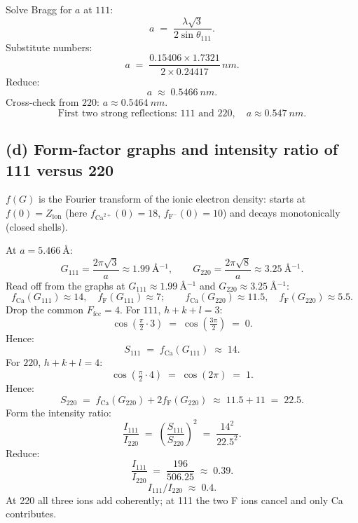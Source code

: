 \documentclass[11pt]{article}
\begin{document}
Solve Bragg for $a$ at $111$:
\[
a \;=\; \frac{\lambda \sqrt{3}}{2\sin\theta_{111}}.
\]
Substitute numbers:
\[
a \;=\; \frac{0.15406\times 1.7321}{2\times 0.24417}\,\si{nm}.
\]
Reduce:
\[
a \;\approx\; \SI{0.5466}{nm}.
\]
Cross-check from $220$: $a\approx\SI{0.5464}{nm}$.
\begin{equation}
\boxed{\;\;\text{First two strong reflections: } 111 \text{ and } 220, \quad a \approx \SI{0.547}{nm}.\;\;}
\label{eq:abox}
\end{equation}

\subsection*{(d) Form-factor graphs and intensity ratio of 111 versus 220}

$f(G)$ is the Fourier transform of the ionic electron density: starts at $f(0)=Z_{\text{ion}}$ (here $f_{\text{Ca}^{2+}}(0)=18$, $f_{\text{F}^-}(0)=10$) and decays monotonically (closed shells).

At $a=\SI{5.466}{\angstrom}$:
\begin{equation}
G_{111}=\frac{2\pi\sqrt 3}{a}\approx \SI{1.99}{\angstrom^{-1}},\qquad G_{220}=\frac{2\pi\sqrt 8}{a}\approx \SI{3.25}{\angstrom^{-1}}.
\label{eq:Gnums}
\end{equation}
Read off from the graphs at $G_{111}\approx \SI{1.99}{\angstrom^{-1}}$ and $G_{220}\approx \SI{3.25}{\angstrom^{-1}}$:
\[
f_{\text{Ca}}(G_{111})\approx 14,\quad f_{\text{F}}(G_{111})\approx 7;\qquad f_{\text{Ca}}(G_{220})\approx 11.5,\quad f_{\text{F}}(G_{220})\approx 5.5.
\]
Drop the common $F_{\text{fcc}}=4$. For $111$, $h+k+l=3$:
\[
\cos\!\left(\tfrac{\pi}{2}\cdot 3\right) \;=\; \cos\!\left(\tfrac{3\pi}{2}\right) \;=\; 0.
\]
Hence:
\[
S_{111} \;=\; f_{\text{Ca}}(G_{111}) \;\approx\; 14.
\]
For $220$, $h+k+l=4$:
\[
\cos\!\left(\tfrac{\pi}{2}\cdot 4\right) \;=\; \cos(2\pi) \;=\; 1.
\]
Hence:
\[
S_{220} \;=\; f_{\text{Ca}}(G_{220}) + 2 f_{\text{F}}(G_{220}) \;\approx\; 11.5 + 11 \;=\; 22.5.
\]
Form the intensity ratio:
\[
\frac{I_{111}}{I_{220}} \;=\; \left(\frac{S_{111}}{S_{220}}\right)^2 \;=\; \frac{14^2}{22.5^2}.
\]
Reduce:
\[
\frac{I_{111}}{I_{220}} \;=\; \frac{196}{506.25} \;\approx\; 0.39.
\]
\begin{equation}
\boxed{\;\; I_{111}/I_{220} \;\approx\; 0.4. \;\;}
\label{eq:Iratiobox}
\end{equation}
At 220 all three ions add coherently; at 111 the two F ions cancel and only Ca contributes.

\end{document}
